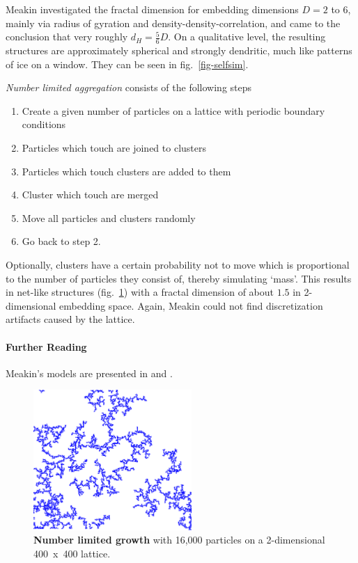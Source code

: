 \documentclass[twocolumn, 10pt]{scrartcl}
\begin{document}
        Meakin investigated the fractal dimension for embedding dimensions $D=2$ to 6, mainly via radius of gyration
        and density-density-correlation, and came to the conclusion that very roughly $d_H=\frac{5}{6}D$.
        On a qualitative level, the resulting structures are approximately spherical and strongly dendritic,
        much like patterns of ice on a window. They can be seen in fig.~\ref{fig-selfsim}.

        \emph{Number limited aggregation} consists of the following steps
        \begin{enumerate}
            \item Create a given number of particles on a lattice with periodic boundary conditions
            \item Particles which touch are joined to clusters
            \item Particles which touch clusters are added to them
            \item Cluster which touch are merged
            \item Move all particles and clusters randomly
            \item Go back to step 2.
        \end{enumerate}
        Optionally, clusters have a certain probability not to move which is proportional to the number of particles
        they consist of, thereby simulating `mass'. This results in net-like structures (fig.~\ref{fig-meakin2}) with a
        fractal dimension of about $1.5$ in 2-dimensional embedding space. Again, Meakin could not find discretization
        artifacts caused by the lattice.

        {\small
            \paragraph{Further Reading}
            Meakin's models are presented in \cite{src-meakin1} and \cite{src-meakin2}.
        }

        \begin{figure}
            \center
            \includegraphics[width=6cm]{img/meakin2.png}
            \caption[Number limited growth]
                {\small\textbf{Number limited growth} with 16,000 particles on a 2-dimensional 400~x~400 lattice.}
            \label{fig-meakin2}
        \end{figure}
\end{document}

